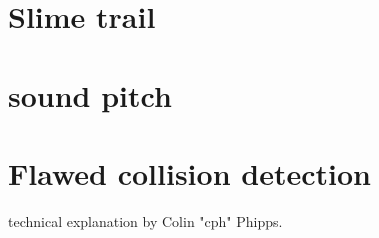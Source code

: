 \section{Slime trail}
\section{sound pitch}
\section{Flawed collision detection}
technical explanation by Colin "cph" Phipps.